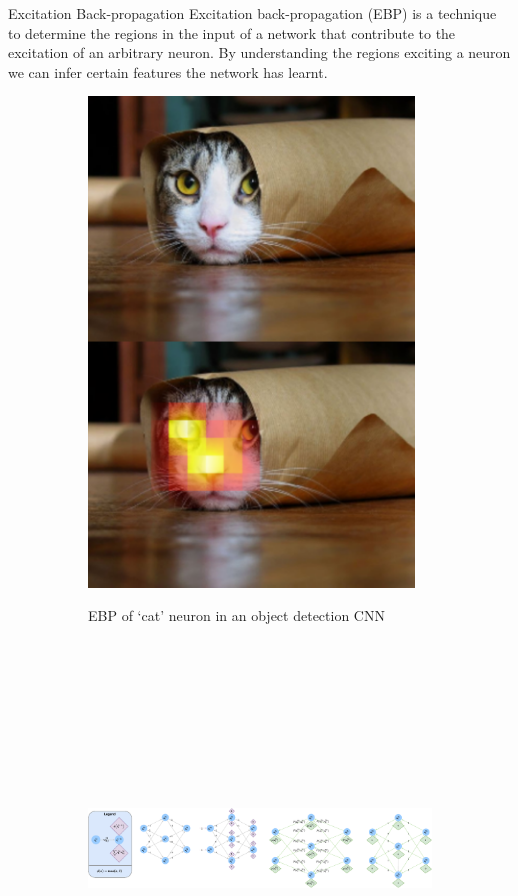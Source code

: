 \documentclass[final]{beamer} %
\begin{document}
\begin{frame}[t]
    \begin{block}{Excitation Back-propagation}
      Excitation back-propagation (EBP) is a technique to determine the regions
      in the input of a network that contribute to the excitation of an
      arbitrary neuron. By understanding the regions exciting a neuron we can
      infer certain features the network has learnt.
      \begin{figure}
        \begin{subfigure}{0.13\linewidth}
          \centering
          \includegraphics[height=13cm]{media/images/ebp-cat}

          EBP of `cat' neuron in an object detection CNN
        \end{subfigure}
        \begin{subfigure}{0.86\linewidth}
          \raggedleft
          \includegraphics[height=11cm]{media/images/ebp-example}


\end{subfigure}
\end{figure}
\end{block}
\end{frame}
\end{document}
